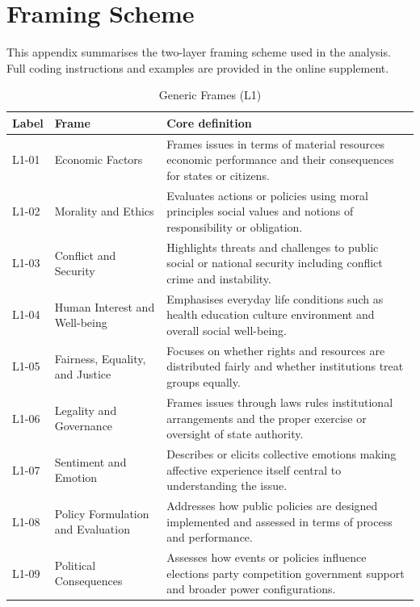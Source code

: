\documentclass[man,12pt]{apa7}
\begin{document}
\printbibliography

\appendix
\section{Framing Scheme}\label{app:framing-scheme}

This appendix summarises the two-layer framing scheme used in the analysis. Full coding instructions and examples are provided in the online supplement.

\begin{table}
\centering
\scriptsize
\caption{Generic Frames (L1)}
\label{tab:generic-frames}
\begin{tabularx}{\textwidth}{l l X}
\toprule
Label & Frame & Core definition \\
\midrule
L1-01 & Economic Factors & Frames issues in terms of material resources economic performance and their consequences for states or citizens. \\
L1-02 & Morality and Ethics & Evaluates actions or policies using moral principles social values and notions of responsibility or obligation. \\
L1-03 & Conflict and Security & Highlights threats and challenges to public social or national security including conflict crime and instability. \\
L1-04 & Human Interest and Well-being & Emphasises everyday life conditions such as health education culture environment and overall social well-being. \\
L1-05 & Fairness, Equality, and Justice & Focuses on whether rights and resources are distributed fairly and whether institutions treat groups equally. \\
L1-06 & Legality and Governance & Frames issues through laws rules institutional arrangements and the proper exercise or oversight of state authority. \\
L1-07 & Sentiment and Emotion & Describes or elicits collective emotions making affective experience itself central to understanding the issue. \\
L1-08 & Policy Formulation and Evaluation & Addresses how public policies are designed implemented and assessed in terms of process and performance. \\
L1-09 & Political Consequences & Assesses how events or policies influence elections party competition government support and broader power configurations. \\
\bottomrule
\end{tabularx}
\end{table}
\end{document}
